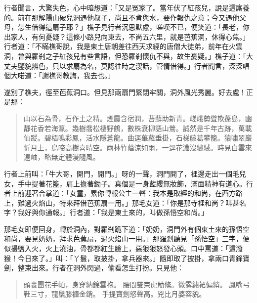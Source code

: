 行者聞言，大驚失色，心中暗想道：「又是冤家了。當年伏了紅孩兒，說是這廝養的。前在那解陽山破兒洞遇他叔子，尚且不肯與水，要作報仇之意；今又遇他父母，怎生借得這扇子耶？」樵子見行者沉思默慮，嗟嘆不已，便笑道：「長老，你出家人，有何憂疑？這條小路兒向東去，不尚五六里，就是芭蕉洞，休得心焦。」行者道：「不瞞樵哥說，我是東土唐朝差往西天求經的唐僧大徒弟，前年在火雲洞，曾與羅剎之子紅孩兒有些言語，但恐羅剎懷仇不與，故生憂疑。」樵子道：「大丈夫鑒貌辨色，只以求扇為名，莫認往時之溲話，管情借得。」行者聞言，深深唱個大喏道：「謝樵哥教誨，我去也。」

遂別了樵夫，徑至芭蕉洞口。但見那兩扇門緊閉牢關，洞外風光秀麗。好去處！正是那：
\begin{quote}
山以石為骨，石作土之精。煙霞含宿潤，苔蘚助新青。嵯峨勢聳欺蓬島，幽靜花香若海瀛。幾樹喬松棲野鶴，數株衰柳語山鶯。誠然是千年古跡，萬載仙蹤。碧梧鳴彩鳳，活水隱蒼龍。曲逕蓽蘿垂掛，石梯藤葛攀籠。猿嘯翠巖忻月上，鳥啼高樹喜晴空。兩林竹蔭涼如雨，一逕花濃沒繡絨。時見白雲來遠岫，略無定體漫隨風。
\end{quote}

行者上前叫：「牛大哥，開門，開門。」呀的一聲，洞門開了，裡邊走出一個毛兒女，手中提著花籃，肩上擔著鋤子。真個是一身藍縷無妝飾，滿面精神有道心。行者上前迎著合掌道：「女童，累你轉報公主一聲：我本是取經的和尚，在西方路上，難過火焰山，特來拜借芭蕉扇一用。」那毛女道：「你是那寺裡和尚？叫甚名字？我好與你通報。」行者道：「我是東土來的，叫做孫悟空和尚。」

那毛女即便回身，轉於洞內，對羅剎跪下道：「奶奶，洞門外有個東土來的孫悟空和尚，要見奶奶，拜求芭蕉扇，過火焰山一用。」那羅剎聽見「孫悟空」三字，便似撮鹽入火，火上澆油，骨都都紅生臉上，惡狠狠怒發心頭。口中罵道：「這潑猴！今日來了。」叫：「丫鬟，取披掛，拿兵器來。」隨即取了披掛，拿兩口青鋒寶劍，整束出來。行者在洞外閃過，偷看怎生打扮。只見他：
\begin{quote}
頭裹團花手帕，身穿納錦雲袍。
腰間雙束虎觔絛。微露繡裙偏綃。
鳳嘴弓鞋三寸，龍鬚膝褲金銷。
手提寶劍怒聲高。兇比月婆容貌。
\end{quote}

